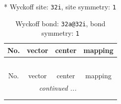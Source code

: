 \documentclass[fleqn,8pt]{jsarticle}
\begin{document}
* Wyckoff site: {\tt 32i}, site symmetry: {\tt 1}
\renewcommand{\arraystretch}{1.2}
\begin{longtable}{cccc}
\caption{Wyckoff bond: {\tt 32a@32i}, bond symmetry: {\tt 1}}
 \\
 \hline \hline
No. & vector & center & mapping \\ \hline \endfirsthead

\multicolumn{3}{l}{\tablename\ \thetable{}} \\
 \hline \hline
No. & vector & center & mapping \\ \hline \endhead

 \hline \hline
\multicolumn{3}{r}{\footnotesize\it continued ...} \\ \endfoot

 \hline \hline
\multicolumn{3}{r}{} \\ \endlastfoot


\end{longtable}
\end{document}
